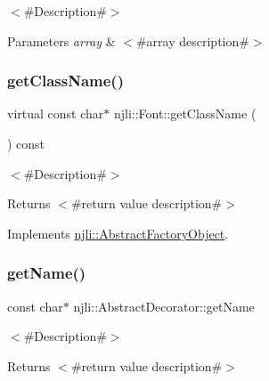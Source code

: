 $<$\#\+Description\#$>$


\begin{DoxyParams}{Parameters}
{\em array} & $<$\#array description\#$>$ \\
\hline
\end{DoxyParams}
\mbox{\label{classnjli_1_1_font_a6e86722e707b66fc3830b7f5dfe1ceda}} 
\subsubsection{\texorpdfstring{get\+Class\+Name()}{getClassName()}}
{\footnotesize\ttfamily virtual const char$\ast$ njli\+::\+Font\+::get\+Class\+Name (\begin{DoxyParamCaption}{ }\end{DoxyParamCaption}) const\hspace{0.3cm}{\ttfamily [virtual]}}

$<$\#\+Description\#$>$

\begin{DoxyReturn}{Returns}
$<$\#return value description\#$>$ 
\end{DoxyReturn}


Implements \mbox{\hyperlink{classnjli_1_1_abstract_factory_object_af4151e41b80d5bc3fc42822c67fc2278}{njli\+::\+Abstract\+Factory\+Object}}.

\mbox{\label{classnjli_1_1_font_ad41266885be835f3ee602311e20877a4}} 
\subsubsection{\texorpdfstring{get\+Name()}{getName()}}
{\footnotesize\ttfamily const char$\ast$ njli\+::\+Abstract\+Decorator\+::get\+Name}

$<$\#\+Description\#$>$

\begin{DoxyReturn}{Returns}
$<$\#return value description\#$>$ 
\end{DoxyReturn}
\mbox{\label{classnjli_1_1_font_ac4ca71716ed832be357f15f8262c8448}} 
